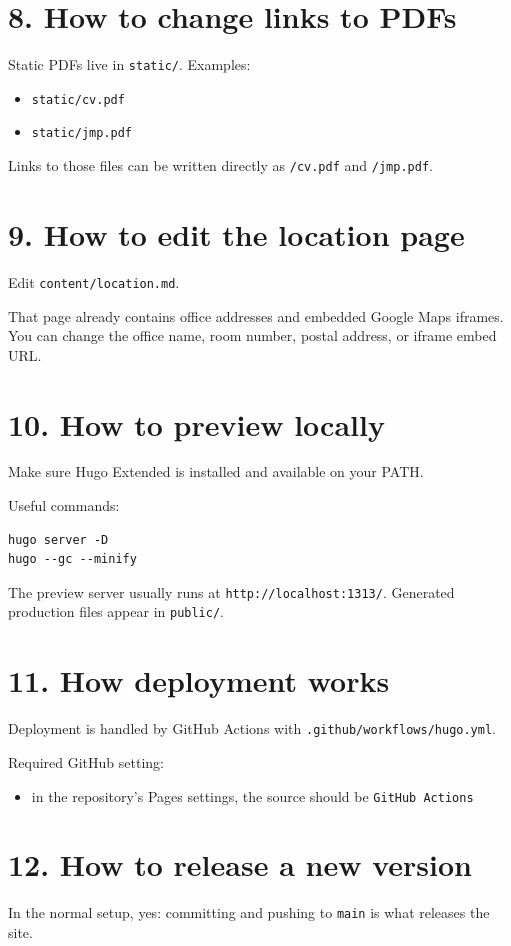 \documentclass[11pt]{article}
\begin{document}
\section*{8. How to change links to PDFs}
Static PDFs live in \texttt{static/}. Examples:
\begin{itemize}
\item \texttt{static/cv.pdf}
\item \texttt{static/jmp.pdf}
\end{itemize}

Links to those files can be written directly as \texttt{/cv.pdf} and \texttt{/jmp.pdf}.

\section*{9. How to edit the location page}
Edit \texttt{content/location.md}.

That page already contains office addresses and embedded Google Maps iframes. You can change the office name, room number, postal address, or iframe embed URL.

\section*{10. How to preview locally}
Make sure Hugo Extended is installed and available on your PATH.

Useful commands:
\begin{verbatim}
hugo server -D
hugo --gc --minify
\end{verbatim}

The preview server usually runs at \texttt{http://localhost:1313/}. Generated production files appear in \texttt{public/}.

\section*{11. How deployment works}
Deployment is handled by GitHub Actions with \texttt{.github/workflows/hugo.yml}.

Required GitHub setting:
\begin{itemize}
\item in the repository's Pages settings, the source should be \texttt{GitHub Actions}
\end{itemize}

\section*{12. How to release a new version}
In the normal setup, yes: committing and pushing to \texttt{main} is what releases the site.
\end{document}

